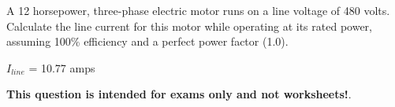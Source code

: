 

A 12 horsepower, three-phase electric motor runs on a line voltage of 480 volts.  Calculate the line current for this motor while operating at its rated power, assuming 100\% efficiency and a perfect power factor (1.0).







$I_{line}$ = 10.77 amps







{\bf This question is intended for exams only and not worksheets!}.


